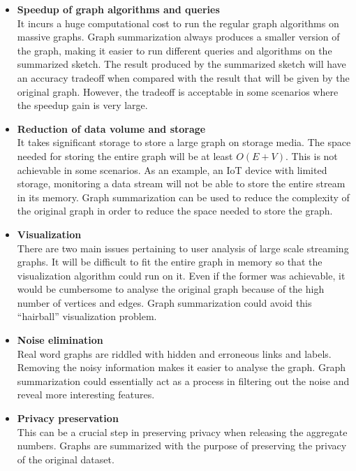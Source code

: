\begin{itemize}
    \item \textbf{Speedup of graph algorithms and queries}\\
          It incurs a huge computational cost to run the regular graph algorithms on massive graphs. Graph summarization always produces a smaller version of the graph, making it easier to run different queries and algorithms on the summarized sketch. The result produced by the summarized sketch will have an accuracy tradeoff when compared with the result that will be given by the original graph\cite{riondato_graph_nodate}. However, the tradeoff is acceptable in some scenarios where the speedup gain is very large.

    \item \textbf{Reduction of data volume and storage}\\
          It takes significant storage to store a large graph on storage media. The space needed for storing the entire graph will be at least \(O(E+V)\). This is not achievable in some scenarios. As an example, an IoT device with limited storage, monitoring a data stream will not be able to store the entire stream in its memory. Graph summarization can be used to reduce the complexity of the original graph in order to reduce the space needed to store the graph\cite{seo_effective_2018}.

    \item \textbf{Visualization\cite{dunne_motif_2013, jin_eco_nodate}}\\
          There are two main issues pertaining to user analysis of large scale streaming graphs. It will be difficult to fit the entire graph in memory so that the visualization algorithm could run on it. Even if the former was achievable, it would be cumbersome to analyse the original graph because of the high number of vertices and edges. Graph summarization could avoid this “hairball” visualization problem\cite{schulz_grooming_2013}.

    \item \textbf{Noise elimination}\\
          Real word graphs are riddled with hidden and erroneous links and labels. Removing the noisy information makes it easier to analyse the graph. Graph summarization could essentially act as a process in filtering out the noise and reveal more interesting features\cite{zhang_discovery-driven_2010}.

    \item \textbf{Privacy preservation}\\
          This can be a crucial step in preserving privacy when releasing the aggregate numbers. Graphs are summarized with the purpose of preserving the privacy of the original dataset\cite{shoaran_zero-knowledge_2013}.
\end{itemize}

